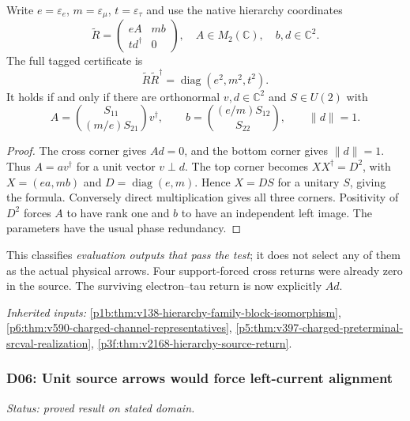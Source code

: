 \documentclass[12pt,a4paper]{article}
\begin{document}
Write $e=\varepsilon_e$, $m=\varepsilon_\mu$, $t=\varepsilon_\tau$ and use
the native hierarchy coordinates
\[
 \widetilde R=\begin{pmatrix}eA&mb\\td^\dagger&0\end{pmatrix},\quad
 A\in M_2(\mathbb C),\quad b,d\in\mathbb C^2.
\]
The full tagged certificate is
\[
 \widetilde R\widetilde R^\dagger=\operatorname{diag}(e^2,m^2,t^2).
\]
It holds if and only if there are orthonormal $v,d\in\mathbb C^2$ and
$S\in U(2)$ with
\[
 \boxed{A=\binom{S_{11}}{(m/e)S_{21}}v^\dagger,\qquad
 b=\binom{(e/m)S_{12}}{S_{22}},\qquad \|d\|=1.}
\]
\begin{proof}
The cross corner gives $Ad=0$, and the bottom corner gives
$\|d\|=1$. Thus $A=av^\dagger$ for a unit vector $v\perp d$.
The top corner becomes $XX^\dagger=D^2$, with
$X=(ea,mb)$ and $D=\operatorname{diag}(e,m)$. Hence $X=DS$ for a unitary
$S$, giving the formula. Conversely direct multiplication gives all three
corners. Positivity of $D^2$ forces $A$ to have rank one and $b$ to have an
independent left image. The parameters have the usual phase redundancy.
\end{proof}
This classifies \emph{evaluation outputs that pass the test}; it does not
select any of them as the actual physical arrows. Four support-forced
cross returns were already zero in the source. The surviving
electron--tau return is now explicitly $Ad$.
\par\noindent\textit{Inherited inputs:} \ref{p1b:thm:v138-hierarchy-family-block-isomorphism}, \ref{p6:thm:v590-charged-channel-representatives}, \ref{p5:thm:v397-charged-preterminal-srcval-realization}, \ref{p3f:thm:v2168-hierarchy-source-return}.

\subsubsection{D06: Unit source arrows would force left-current alignment}
\label{p6:sec:v2201-derived-d06}
\noindent\textit{Status: proved result on stated domain.}
\end{document}
